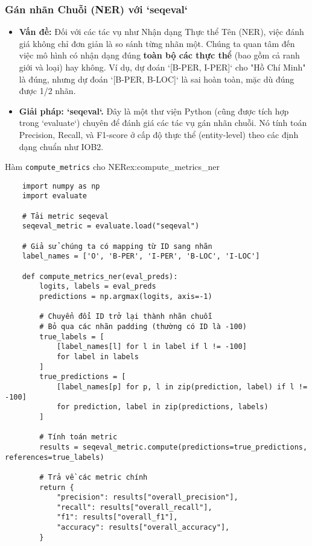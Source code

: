 \subsubsection{Gán nhãn Chuỗi (NER) với `seqeval`}
\begin{itemize}
    \item \textbf{Vấn đề:} Đối với các tác vụ như Nhận dạng Thực thể Tên (NER), việc đánh giá không chỉ đơn giản là so sánh từng nhãn một. Chúng ta quan tâm đến việc mô hình có nhận dạng đúng \textbf{toàn bộ các thực thể} (bao gồm cả ranh giới và loại) hay không. Ví dụ, dự đoán `[B-PER, I-PER]` cho "Hồ Chí Minh" là đúng, nhưng dự đoán `[B-PER, B-LOC]` là sai hoàn toàn, mặc dù đúng được 1/2 nhãn.
    \item \textbf{Giải pháp: `seqeval`.} Đây là một thư viện Python (cũng được tích hợp trong `evaluate`) chuyên để đánh giá các tác vụ gán nhãn chuỗi. Nó tính toán Precision, Recall, và F1-score ở cấp độ thực thể (entity-level) theo các định dạng chuẩn như IOB2.
\end{itemize}

\begin{example}{Hàm \texttt{compute\_metrics} cho NER}{ex:compute_metrics_ner}
    \begin{verbatim}
    import numpy as np
    import evaluate

    # Tải metric seqeval
    seqeval_metric = evaluate.load("seqeval")

    # Giả sử chúng ta có mapping từ ID sang nhãn
    label_names = ['O', 'B-PER', 'I-PER', 'B-LOC', 'I-LOC']

    def compute_metrics_ner(eval_preds):
        logits, labels = eval_preds
        predictions = np.argmax(logits, axis=-1)

        # Chuyển đổi ID trở lại thành nhãn chuỗi
        # Bỏ qua các nhãn padding (thường có ID là -100)
        true_labels = [
            [label_names[l] for l in label if l != -100]
            for label in labels
        ]
        true_predictions = [
            [label_names[p] for p, l in zip(prediction, label) if l != -100]
            for prediction, label in zip(predictions, labels)
        ]
        
        # Tính toán metric
        results = seqeval_metric.compute(predictions=true_predictions, references=true_labels)
        
        # Trả về các metric chính
        return {
            "precision": results["overall_precision"],
            "recall": results["overall_recall"],
            "f1": results["overall_f1"],
            "accuracy": results["overall_accuracy"],
        }
    \end{verbatim}
\end{example}

